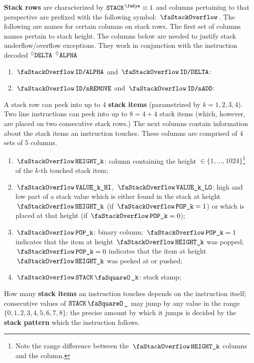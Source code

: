 \textbf{Stack rows}\label{def: stack row} are characterized by $\peekStack \equiv 1$ and columns pertaining to that perspective are prefixed with the following symbol: $\stackSignifier$.
The following are names for certain columns on stack rows.
The first set of columns names pertain to stack height.
The columns below are needed to justify stack underflow/overflow exceptions.
They work in conjunction with the instruction decoded $\prescript{\lozenge}{}{\texttt{DELTA}}$ $\prescript{\lozenge}{}{\texttt{ALPHA}}$
\begin{enumerate}[resume]
	\item $\stackAlpha$    and $\stackDelta$:
	\item $\stackNbRemove$ and $\stackNbAdd$:
\end{enumerate}
A stack row can peek into up to 4 \textbf{stack items} (parametrized by $k=1,2,3,4$).
Two line instructions can peek into up to $8 = 4 + 4$ stack items (which, however, are placed on two consecutive stack rows.)
The next columns contain information about the stack items an instruction touches.
These columns are comprised of 4 sets of 5 columns.
\begin{enumerate}[resume]
	\item $\stackItemHeight{k}$:
		column containing the height $\in\{1,\dots,1024\}$\footnote{Note the range difference between the $\stackItemHeight{k}$ columns and the \stackHeight{} column.} of the $k$-th touched stack item;
	\item $\stackItemValHi{k}$, $\stackItemValLo{k}$:
		high and low part of a stack value which is either found in the stack at height $\stackItemHeight{k}$ (if $\stackItemPop{k} = 1$) or which is placed at that height (if $\stackItemPop{k} = 0$);
	\item $\stackItemPop{k}$:
		binary column; $\stackItemPop{k} = 1$ indicates that the item at height $\stackItemHeight{k}$ was popped; $\stackItemPop{k} = 0$ indicates that the item at height $\stackItemHeight{k}$ was peeked at or pushed; 
	\item $\stackItemStamp{k}$:
		stack stamp;
\end{enumerate}
How many \textbf{stack items} an instruction touches depends on the instruction itself; consecutive values of $\sStamp{}$ may jump by any value in the range $\{0,1,2,3,4,5,6,7,8\}$; the precise amount by which it jumps is decided by the \textbf{stack pattern} which the instruction follows.
